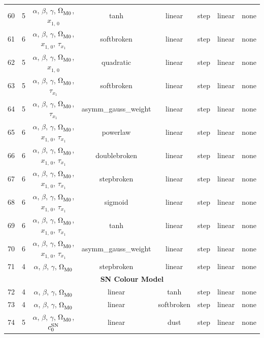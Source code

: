 \begin{longtable}{c c c c c c c c}
    60 & 5 & $\alpha$, $\beta$, $\gamma$, $\Omega_{\rm M0}^{}$, $x_{1,\,0}^{}$ & tanh & linear & step & linear & none \\
    61 & 6 & $\alpha$, $\beta$, $\gamma$, $\Omega_{\rm M0}^{}$, $x_{1,\,0}^{}$, $\tau_{x_1}^{}$ & softbroken & linear & step & linear & none \\
    62 & 5 & $\alpha$, $\beta$, $\gamma$, $\Omega_{\rm M0}^{}$, $x_{1,\,0}^{}$ & quadratic & linear & step & linear & none \\
    63 & 5 & $\alpha$, $\beta$, $\gamma$, $\Omega_{\rm M0}^{}$, $\tau_{x_1}^{}$ & softbroken & linear & step & linear & none \\
    64 & 5 & $\alpha$, $\beta$, $\gamma$, $\Omega_{\rm M0}^{}$, $\tau_{x_1}^{}$ & asymm\_gauss\_weight & linear & step & linear & none \\
    65 & 6 & $\alpha$, $\beta$, $\gamma$, $\Omega_{\rm M0}^{}$, $x_{1,\,0}^{}$, $\tau_{x_1}^{}$ & powerlaw & linear & step & linear & none \\
    66 & 6 & $\alpha$, $\beta$, $\gamma$, $\Omega_{\rm M0}^{}$, $x_{1,\,0}^{}$, $\tau_{x_1}^{}$ & doublebroken & linear & step & linear & none \\
    67 & 6 & $\alpha$, $\beta$, $\gamma$, $\Omega_{\rm M0}^{}$, $x_{1,\,0}^{}$, $\tau_{x_1}^{}$ & stepbroken & linear & step & linear & none \\
    68 & 6 & $\alpha$, $\beta$, $\gamma$, $\Omega_{\rm M0}^{}$, $x_{1,\,0}^{}$, $\tau_{x_1}^{}$ & sigmoid & linear & step & linear & none \\
    69 & 6 & $\alpha$, $\beta$, $\gamma$, $\Omega_{\rm M0}^{}$, $x_{1,\,0}^{}$, $\tau_{x_1}^{}$ & tanh & linear & step & linear & none \\
    70 & 6 & $\alpha$, $\beta$, $\gamma$, $\Omega_{\rm M0}^{}$, $x_{1,\,0}^{}$, $\tau_{x_1}^{}$ & asymm\_gauss\_weight & linear & step & linear & none \\
    71 & 4 & $\alpha$, $\beta$, $\gamma$, $\Omega_{\rm M0}^{}$ & stepbroken & linear & step & linear & none \\
    \hline
    \multicolumn{8}{c}{\textbf{SN Colour Model}} \\
    \hline
    72 & 4 & $\alpha$, $\beta$, $\gamma$, $\Omega_{\rm M0}^{}$ & linear & tanh & step & linear & none \\
    73 & 4 & $\alpha$, $\beta$, $\gamma$, $\Omega_{\rm M0}^{}$ & linear & softbroken & step & linear & none \\
    74 & 5 & $\alpha$, $\beta$, $\gamma$, $\Omega_{\rm M0}^{}$, $c_0^{\rm SN}$ & linear & dust & step & linear & none \\

\end{longtable}
